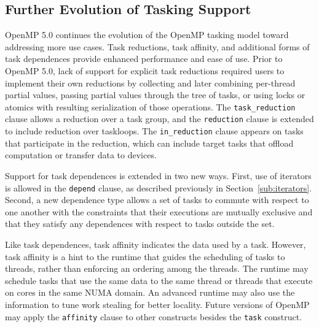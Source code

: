 \subsection{Further Evolution of Tasking Support}
\label{sub:new_tasking}

OpenMP 5.0 continues the evolution of the OpenMP tasking model toward 
addressing more use cases.  Task reductions, task affinity, and 
additional forms of task dependences provide enhanced performance and 
ease of use.  Prior to OpenMP 5.0, lack of support for explicit task 
reductions required users to implement their own reductions by 
collecting and later combining per-thread partial values, passing 
partial values through the tree of tasks, or using locks or atomics 
with resulting serialization of those operations.  The 
\texttt{task\_reduction} clause allows a reduction over a task group, 
and the \texttt{reduction} clause is extended to include reduction 
over taskloops.  The \texttt{in\_reduction} clause appears on tasks that 
participate in the reduction, which can include target tasks that 
offload computation or transfer data to devices.

Support for task dependences is extended in two new ways.  First, use 
of iterators is allowed in the \texttt{depend} clause, as described 
previously in Section~\ref{sub:iterators}. Second, a new dependence type 
allows a set of tasks to commute with respect to one another with the 
constraints that their executions are mutually exclusive and that 
they satisfy any dependences with respect to tasks outside the set.

Like task dependences, task affinity indicates the data used by a task. 
However, task affinity is a hint to the runtime that guides the scheduling 
of tasks to threads, rather than enforcing an ordering among the threads. 
The runtime may schedule tasks that use the same data to the same thread 
or threads that execute on cores in the same NUMA  domain. An advanced 
runtime may also use the information to tune work stealing for better 
locality. Future versions of OpenMP may apply the \texttt{affinity} clause to other constructs besides the \texttt{task} construct.

